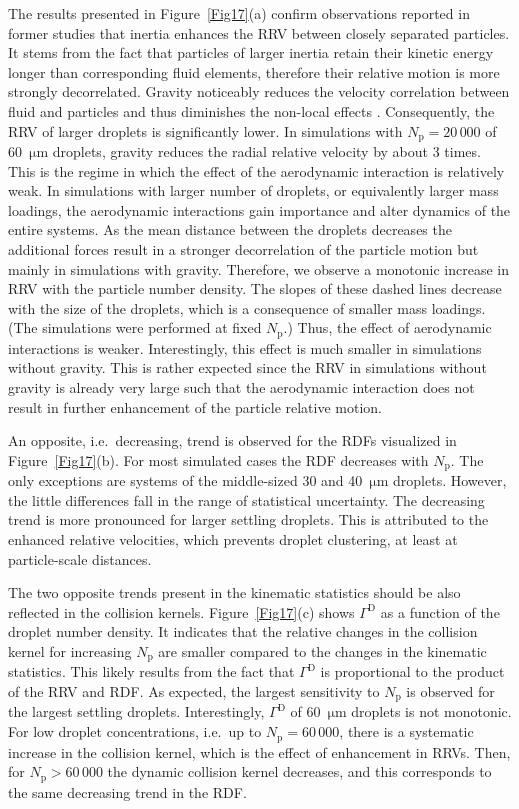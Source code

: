 \documentclass[../thesis.tex]{subfiles}
\begin{document}
The results presented in Figure~\ref{Fig17}(a) confirm observations reported in former studies \citep[e.g.][]{RPAGW13} that inertia enhances the RRV between closely separated particles. It stems from the fact that particles of larger inertia retain their kinetic energy longer than corresponding fluid elements, therefore their relative motion is more strongly decorrelated. Gravity noticeably reduces the velocity correlation between fluid and particles and thus diminishes the non-local effects \citep{IBC16}. Consequently, the RRV of larger droplets is significantly lower. In simulations with $N_\mathrm{p} = 20\,000$ of 60~$\mathrm{\mu m}$ droplets, gravity reduces the radial relative velocity by about 3 times. This is the regime in which the effect of the aerodynamic interaction is relatively weak. In simulations with larger number of droplets, or equivalently larger mass loadings, the aerodynamic interactions gain importance and alter dynamics of the entire systems. As the mean distance between the droplets decreases the additional forces result in a stronger decorrelation of the particle motion but mainly in simulations with gravity. Therefore, we observe a monotonic increase in RRV with the particle number density. The slopes of these dashed lines decrease with the size of the droplets, which is a consequence of smaller mass loadings. (The simulations were performed at fixed $N_\mathrm{p}$.) Thus, the effect of aerodynamic interactions is weaker. Interestingly, this effect is much smaller in simulations without gravity. This is rather expected since the RRV in simulations without gravity is already very large such that the aerodynamic interaction does not result in further enhancement of the particle relative motion.

An opposite, i.e.\ decreasing, trend is observed for the RDFs visualized in Figure~\ref{Fig17}(b). For most simulated cases the RDF decreases with $N_\mathrm{p}$. The only exceptions are systems of the middle-sized 30 and 40~$\mathrm{\mu m}$ droplets. However, the little differences fall in the range of statistical uncertainty. The decreasing trend is more pronounced for larger settling droplets. This is attributed to the enhanced relative velocities, which prevents droplet clustering, at least at particle-scale distances.

The two opposite trends present in the kinematic statistics should be also reflected in the collision kernels. Figure~\ref{Fig17}(c) shows $\Gamma^\text{D}$ as a function of the droplet number density. It indicates that the relative changes in the collision kernel for increasing $N_\mathrm{p}$ are smaller compared to the changes in the kinematic statistics. This likely results from the fact that $\Gamma^\text{D}$ is proportional to the product of the RRV and RDF. As expected, the largest sensitivity to $N_\mathrm{p}$ is observed for the largest settling droplets. Interestingly, $\Gamma^\text{D}$ of 60~$\mathrm{\mu m}$ droplets is not monotonic. For low droplet concentrations, i.e.\ up to $N_\mathrm{p} = 60\,000$, there is a systematic increase in the collision kernel, which is the effect of enhancement in RRVs. Then, for $N_\mathrm{p} > 60\,000$ the dynamic collision kernel decreases, and this corresponds to the same decreasing trend in the RDF.
\end{document}
